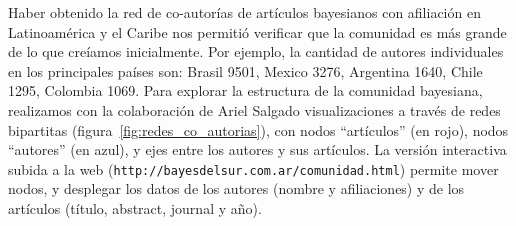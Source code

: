 \documentclass[a4paper,11pt]{book}
\theoremstyle{definition}
\begin{document}

Haber obtenido la red de co-autorías de artículos bayesianos con afiliación en Latinoamérica y el Caribe nos permitió verificar que la comunidad es más grande de lo que creíamos inicialmente.
%
Por ejemplo, la cantidad de autores individuales en los principales países son: Brasil 9501, Mexico 3276, Argentina 1640, Chile 1295, Colombia 1069.
%
Para explorar la estructura de la comunidad bayesiana, realizamos con la colaboración de Ariel Salgado visualizaciones a través de redes bipartitas (figura~\ref{fig:redes_co_autorias}), con nodos ``artículos'' (en rojo), nodos ``autores'' (en azul), y ejes entre los autores y sus artículos.
%
La versión interactiva subida a la web (\texttt{http://bayesdelsur.com.ar/comunidad.html}) permite mover nodos, y desplegar los datos de los autores (nombre y afiliaciones) y de los artículos (título, abstract, journal y año).

\end{document}
